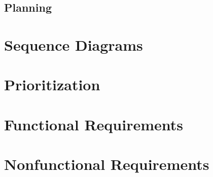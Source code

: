 \subsection{Planning}
\section{Sequence Diagrams}

\section{Prioritization}



\section{Functional Requirements}
\section{Nonfunctional Requirements}

